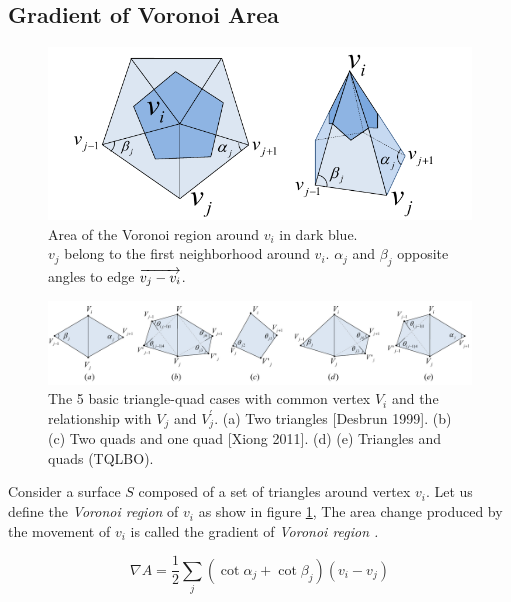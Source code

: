 \documentclass[10pt, conference]{IEEEtran}
\begin{document}
\subsection{Gradient of Voronoi Area}

\begin{figure}[h]
\includegraphics[width=1\columnwidth]{figs/voronoi_region}

\caption{\label{fig:voronoi_region}Area of the Voronoi region around $v_{i}$
in dark blue.\protect \\
 $v_{j}$ belong to the first neighborhood around $v_{i}$. $\alpha_{j}$
and $\beta_{j}$ opposite angles to edge $\protect\overrightarrow{v_{j}-v_{i}}$. }
\end{figure}

\begin{figure}[t]
\includegraphics[width=1\textwidth]{figs/beltrami}

\caption{\label{fig:LBO-basic-5-TQ}The 5 basic triangle-quad cases with common
vertex $V_{i}$ and the relationship with $V_{j}$ and $V_{j}^{\prime}$.
(a) Two triangles {[}Desbrun 1999{]}. (b) (c) Two quads and one quad
{[}Xiong 2011{]}. (d) (e) Triangles and quads (TQLBO).}
\end{figure}

Consider a surface $S$ composed of a set of triangles around vertex
$v_{i}$. Let us define the \textit{Voronoi region} of $v_{i}$ as
show in figure \ref{fig:voronoi_region}, The area change produced
by the movement of $v_{i}$ is called the gradient of \textit{Voronoi
region \cite{Pinkall1993,Desbrun1999,Meyer2003}.}

\begin{equation}
\nabla A=\frac{1}{2}\underset{j}{\sum}\left(\cot\alpha_{j}+\cot\beta_{j}\right)\left(v_{i}-v_{j}\right)\label{eq:eq_gradient_voronoi_area}
\end{equation}
\end{document}
